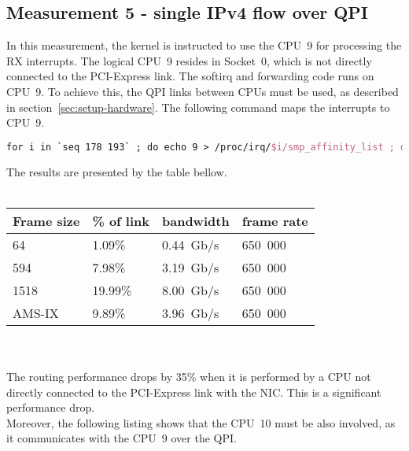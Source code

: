 
\subsection{Measurement 5 - single IPv4 flow over QPI}
In this measurement, the kernel is instructed to use the CPU~9 for processing the RX interrupts.
The logical CPU~9 resides in Socket~0, which is not directly connected to the PCI-Express link.
The softirq and forwarding code runs on CPU~9.
To achieve this, the QPI links between CPUs must be used, as described in section~\ref{sec:setup-hardware}.
The following command maps the interrupts to CPU~9.
\begin{lstlisting}[language=TeX]
for i in `seq 178 193` ; do echo 9 > /proc/irq/$i/smp_affinity_list ; done
\end{lstlisting}
The results are presented by the table bellow.
\\
\\
\begin{tabular}{ | l | l | l | l | }
\hline
Frame size & \% of link & bandwidth & frame rate \\
\hline
64     &  1.09\% &  0.44~Gb/s & 650~000 \\
594    &  7.98\% &  3.19~Gb/s & 650~000 \\
1518   & 19.99\% &  8.00~Gb/s & 650~000 \\
AMS-IX &  9.89\% &  3.96~Gb/s & 650~000 \\
\hline
\end{tabular}
\\
\\
The routing performance drops by 35\% when it is performed by
a CPU not directly connected to the PCI-Express link with the NIC.
This is a significant performance drop.
\\
Moreover, the following listing shows that the CPU~10 must be also involved, as
it communicates with the CPU~9 over the QPI.
